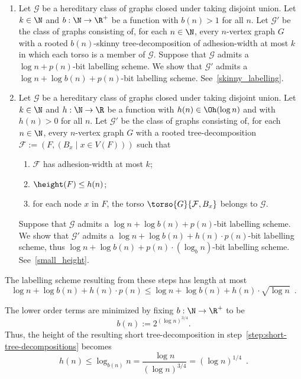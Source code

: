 \begin{enumerate}[label=\rm(\alph*)]
  \item \label{step:skinny-tree-decomposition}
        Let $\mathcal{G}$ be a hereditary class of graphs closed under taking disjoint union.
        Let $k\in\N$ and $b:\N\to\R^+$ be a function with $b(n)>1$ for all $n$.
        Let $\mathcal{G}'$ be the class of graphs consisting of, for each $n\in\N$, every $n$-vertex graph $G$ with a rooted $b(n)$-skinny tree-decomposition of adhesion-width at most $k$ in which each torso is a member of $\mathcal{G}$.
        Suppose that $\mathcal{G}$ admits a $\log n + p(n)$-bit labelling scheme.
        We show that $\mathcal{G}'$ admits a $\log n +\log b(n) + p(n)$-bit labelling scheme. See~\cref{skinny_labelling}.
  \item \label{step:short-tree-decompositions}
        Let $\mathcal{G}$ be a hereditary class of graphs closed under taking disjoint union.
        Let $k\in\N$ and  $h:\N\to\R$ be a function with $h(n)\in \Oh(\log n)$ and with $h(n)>0$ for all $n$.
        Let $\mathcal{G'}$ be the class of graphs consisting of, for each $n\in\N$, every $n$-vertex graph $G$ with a rooted tree-decomposition $\mathcal{F}:=(F,(B_x \mid x\in V(F)))$ such that
        \begin{enumerate}[nosep,nolistsep,label=(\rm{\roman*)}]
          \item $\mathcal{F}$ has adhesion-width at most $k$;
          \item $\height(F)\le h(n)$;
          \item for each node $x$ in $F$, the torso $\torso{G}{\mathcal{F},B_x}$  belongs to $\mathcal{G}$.
        \end{enumerate}
        Suppose that $\mathcal{G}$ admits a $\log n +\log b(n) + p(n)$-bit labelling scheme.
        We show that $\mathcal{G}'$ admits a $\log n +\log b(n) + h(n)\cdot p(n)$-bit labelling scheme, thus $\log n + \log b(n) + p(n)\cdot(\log_b n)$-bit labelling scheme. See~\cref{small_height}.
\end{enumerate}

The labelling scheme resulting from these steps has length at most \[
\log n +\log b(n) + h(n)\cdot p(n) \leq \log n +\log b(n) + h(n)\cdot \sqrt{\log n} \enspace.
\]

The lower order terms are minimized by fixing $b:\N\to\R^+$ to be
\[
  b(n):= 2^{(\log n)^{3/4}}.
\]
Thus, the height of the resulting short tree-decomposition in step~\ref{step:short-tree-decompositions} becomes
\[
  h(n) \leq \log_{b(n)}n = \frac{\log n}{(\log n)^{3/4}} = (\log n)^{1/4} \enspace.
\]

